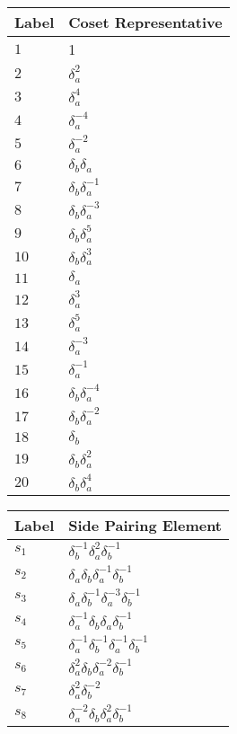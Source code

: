 \documentclass{article}
\begin{document}
\begin{center}
\begin{tabular}{ll}
\toprule
Label & Coset Representative\\
\midrule
$1$ & 1 \\
$2$ & $\delta_a^{2}$ \\
$3$ & $\delta_a^{4}$ \\
$4$ & $\delta_a^{-4}$ \\
$5$ & $\delta_a^{-2}$ \\
$6$ & $\delta_b^{}\delta_a^{}$ \\
$7$ & $\delta_b^{}\delta_a^{-1}$ \\
$8$ & $\delta_b^{}\delta_a^{-3}$ \\
$9$ & $\delta_b^{}\delta_a^{5}$ \\
$10$ & $\delta_b^{}\delta_a^{3}$ \\
$11$ & $\delta_a^{}$ \\
$12$ & $\delta_a^{3}$ \\
$13$ & $\delta_a^{5}$ \\
$14$ & $\delta_a^{-3}$ \\
$15$ & $\delta_a^{-1}$ \\
$16$ & $\delta_b^{}\delta_a^{-4}$ \\
$17$ & $\delta_b^{}\delta_a^{-2}$ \\
$18$ & $\delta_b^{}$ \\
$19$ & $\delta_b^{}\delta_a^{2}$ \\
$20$ & $\delta_b^{}\delta_a^{4}$ \\
\bottomrule
\end{tabular}
\hfill
\begin{tabular}{ll}
\toprule
Label & Side Pairing Element\\
\midrule
$s_{1}$ & $\delta_b^{-1}\delta_a^{2}\delta_b^{-1}$ \\
$s_{2}$ & $\delta_a^{}\delta_b^{}\delta_a^{-1}\delta_b^{-1}$ \\
$s_{3}$ & $\delta_a^{}\delta_b^{-1}\delta_a^{-3}\delta_b^{-1}$ \\
$s_{4}$ & $\delta_a^{-1}\delta_b^{}\delta_a^{}\delta_b^{-1}$ \\
$s_{5}$ & $\delta_a^{-1}\delta_b^{-1}\delta_a^{-1}\delta_b^{-1}$ \\
$s_{6}$ & $\delta_a^{2}\delta_b^{}\delta_a^{-2}\delta_b^{-1}$ \\
$s_{7}$ & $\delta_a^{2}\delta_b^{-2}$ \\
$s_{8}$ & $\delta_a^{-2}\delta_b^{}\delta_a^{2}\delta_b^{-1}$ \\

\end{tabular}
\end{center}
\end{document}
